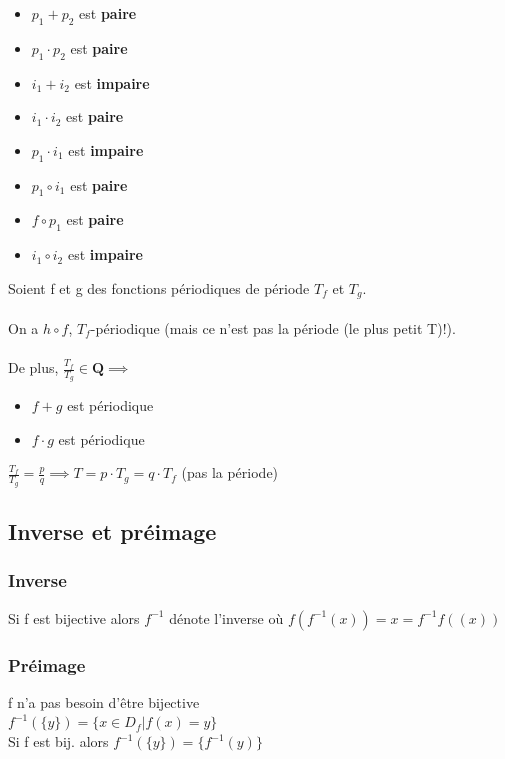 \documentclass{article}
\begin{document}
\begin{itemize}
    \item $ p_1 + p_2 $ est \textbf{paire}
    \item $ p_1 \cdot p_2 $ est \textbf{paire}
    \item $ i_1 + i_2 $ est \textbf{impaire}
    \item $ i_1 \cdot i_2 $ est \textbf{paire}
    \item $ p_1 \cdot i_1 $ est \textbf{impaire}
    \item $ p_1 \circ i_1 $ est \textbf{paire}
    \item $ f \circ p_1 $ est \textbf{paire}
    \item $ i_1 \circ i_2 $ est \textbf{impaire}
\end{itemize}
Soient f et g des fonctions périodiques de période $ T_f $ et $ T_g $.\\\\
On a $ h\circ f$, $ T_f $-périodique (mais ce n'est pas la période (le plus petit T)!).\\\\
De plus, $ \frac{T_f}{T_g} \in \mathbf{Q} \implies $

\begin{itemize}
    \item $ f + g $ est périodique
    \item $ f \cdot g $ est périodique
\end{itemize}
$\frac{T_f}{T_g} = \frac{p}{q} \implies T = p \cdot T_g = q \cdot T_f$ (pas la période)
\subsection{Inverse et préimage}

\subsubsection{Inverse}

Si f est bijective alors $ f^{-1} $ dénote l'inverse où $ f(f^{-1}(x)) = x = f^{-1}f((x))$
\subsubsection{Préimage}

f n'a pas besoin d'être bijective\\
$ f^{-1}(\{y\}) = \{ x \in D_f | f(x) = y\}$\\
Si f est bij. alors $ f^{-1}(\{y\}) = \{f^{-1}(y)\} $
\end{document}
